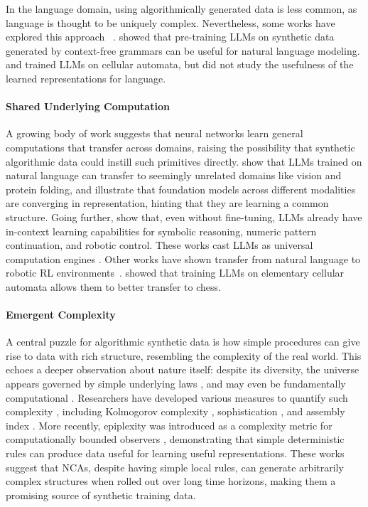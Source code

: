 \documentclass{article}
\theoremstyle{plain}
\theoremstyle{definition}
\theoremstyle{remark}
\begin{document}
In the language domain, using algorithmically generated data is less common, as language is thought to be uniquely complex.
Nevertheless, some works have explored this approach ~\citep{saxton2019analysingmathematicalreasoningabilities,desai2015programsynthesisusingnatural,papadimitriou2023injecting}.
\citet{chiang2020pretraininglanguagemodelhuman, hu2025between} showed that pre-training LLMs on synthetic data generated by context-free grammars can be useful for natural language modeling. \citet{berkovich2025lifegpt} and \citet{berkovich2025automatagpt} trained LLMs on cellular automata, but did not study the usefulness of the learned representations for language.

\paragraph{Shared Underlying Computation}
A growing body of work suggests that neural networks learn general computations that transfer across domains, raising the possibility that synthetic algorithmic data could instill such primitives directly. \citet{lu2022frozen} show that LLMs trained on natural language can transfer to seemingly unrelated domains like vision and protein folding, and \citet{huh2024platonicrepresentationhypothesis} illustrate that foundation models across different modalities are converging in representation, hinting that they are learning a common structure.
Going further, \citet{mirchandani2023large} show that, even without fine-tuning, LLMs already have in-context learning capabilities for symbolic reasoning, numeric pattern continuation, and robotic control. These works cast LLMs as universal computation engines \citep{lu2022frozen}.
Other works have shown transfer from natural language to robotic RL environments~\citep{reid2022can}.
\citet{zhang2024intelligence} showed that training LLMs on elementary cellular automata allows them to better transfer to chess.

\paragraph{Emergent Complexity}
A central puzzle for algorithmic synthetic data is how simple procedures can give rise to data with rich structure, resembling the complexity of the real world. This echoes a deeper observation about nature itself: despite its diversity, the universe appears governed by simple underlying laws \citep{wigner1990unreasonable, tegmark2008mathematical}, and may even be fundamentally computational \citep{wolfram2020class}. Researchers have developed various measures to quantify such complexity \citep{lloyd2001measures, mitchell2009complexity}, including Kolmogorov complexity \citep{kolmogorov1963tables}, sophistication \citep{mota2013sophistication}, and assembly index \citep{sharma2023assembly}. More recently, epiplexity was introduced as a complexity metric for computationally bounded observers \citep{finzi2026entropy}, demonstrating that simple deterministic rules can produce data useful for learning useful representations. These works suggest that NCAs, despite having simple local rules, can generate arbitrarily complex structures when rolled out over long time horizons, making them a promising source of synthetic training data.
\end{document}
